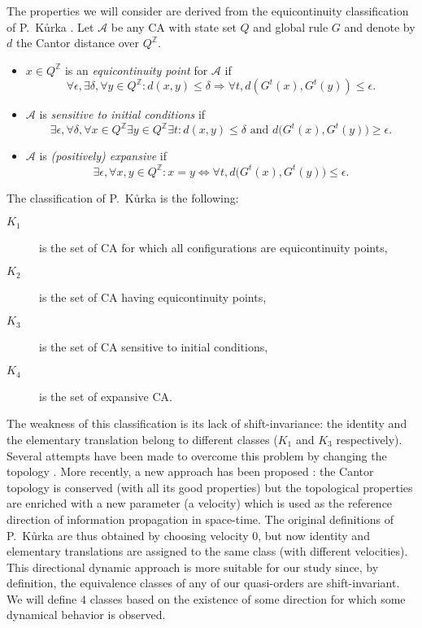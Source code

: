 \documentclass[a4paper]{elsarticle}
\newcommand{\ZZ}{\mathbb{Z}}
\newcommand{\ACA}{\mathcal{A}}
\newcommand\dist{d}
\begin{document}
The properties we will consider are derived from the equicontinuity
classification of P.~K{\r u}rka \cite{Kurka97}. Let $\ACA$ be any CA
with state set $Q$ and global rule $G$ and denote by $\dist$ the
Cantor distance over $Q^\ZZ$.
\begin{itemize}
\item $x\in Q^\ZZ$ is an \emph{equicontinuity point} for $\ACA$ if 
  \[\forall\epsilon, \exists\delta, \forall y\in Q^\ZZ :
  \dist(x,y)\leq\delta\Rightarrow \forall t,
  d(G^t(x),G^t(y))\leq\epsilon.\]
\item $\ACA$ is \emph{sensitive to initial conditions} if
  \[\exists\epsilon, \forall\delta, \forall x\in Q^\ZZ\exists y\in Q^\ZZ
  \exists t : \dist(x,y)\leq\delta\text{ and
  }\dist\bigl(G^t(x),G^t(y)\bigr)\geq\epsilon.\]
\item $\ACA$ is \emph{(positively) expansive} if
  \[\exists\epsilon,\forall x,y\in Q^\ZZ : x=y\iff\forall t,
  \dist\bigl(G^t(x),G^t(y)\bigr)\leq\epsilon.\]
\end{itemize}

The classification of P.~K{\r u}rka is the following:
\begin{description}
\item[$K_1$] is the set of CA for which all configurations are equicontinuity points,
\item[$K_2$] is the set of CA having equicontinuity points,
\item[$K_3$] is the set of CA sensitive to initial conditions,
\item[$K_4$] is the set of expansive CA.
\end{description}

The weakness of this classification is its lack of shift-invariance:
the identity and the elementary translation belong to different
classes ($K_1$ and $K_3$ respectively). Several attempts have been
made to overcome this problem by changing the topology \cite{besico}.
More recently, a new approach has been proposed \cite{sablikTCS}: the
Cantor topology is conserved (with all its good properties) but the
topological properties are enriched with a new parameter (a velocity)
which is used as the reference direction of information propagation in
space-time. The original definitions of P.~K{\r u}rka are thus
obtained by choosing velocity $0$, but now identity and elementary
translations are assigned to the same class (with different
velocities). This directional dynamic approach is more suitable for
our study since, by definition, the equivalence classes of any of our
quasi-orders are shift-invariant. We will define $4$ classes based on
the existence of some direction for which some dynamical behavior is
observed.
\end{document}
